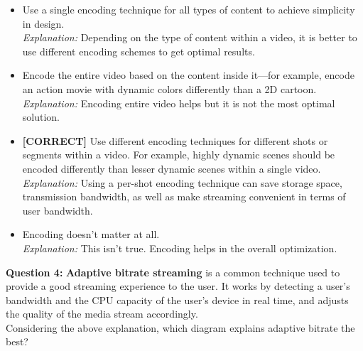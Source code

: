 \begin{itemize}
 \item Use a single encoding technique for all types of content to achieve simplicity in design.
\\[0.1cm]
\textit{Explanation:} 
Depending on the type of content within a video, it is better to use different encoding schemes to get optimal results.
 \item Encode the entire video based on the content inside it---for example, encode an action movie with dynamic colors differently than a 2D cartoon.
\\[0.1cm]
\textit{Explanation:} 
Encoding entire video helps but it is not the most optimal solution.
 \item \textbf{[CORRECT]} Use different encoding techniques for different shots or segments within a video. For example, highly dynamic scenes should be encoded differently than lesser dynamic scenes within a single video.
\\[0.1cm]
\textit{Explanation:} 
Using a per-shot encoding technique can save storage space, transmission bandwidth, as well as make streaming convenient in terms of user bandwidth.
 \item Encoding doesn't matter at all.
\\[0.1cm]
\textit{Explanation:} 
This isn't true. Encoding helps in the overall optimization.
\end{itemize}
\vspace{0.3cm}
\noindent
\textbf{Question 4:} \textbf{Adaptive bitrate streaming} is a common technique used to provide a good streaming experience to the user. It works by detecting a user's bandwidth and the CPU capacity of the user's device in real time, and adjusts the quality of the media stream accordingly.
\\
Considering the above explanation, which diagram explains adaptive bitrate the best?
\\[0.2cm]
